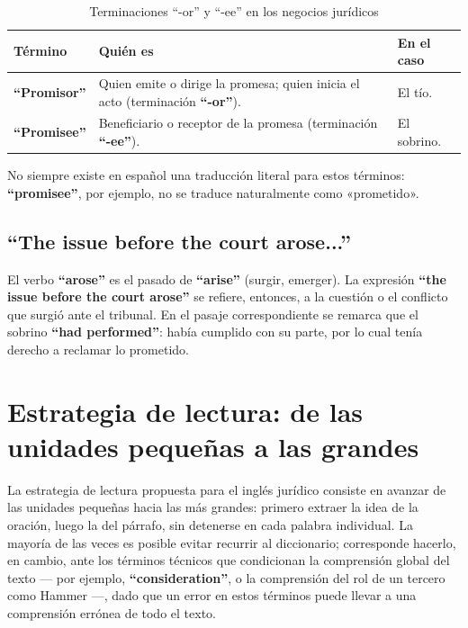\documentclass[12pt,oneside]{book}
\begin{document}
\begin{table}[H]
\centering
\caption{Terminaciones ``-or'' y ``-ee'' en los negocios jurídicos}
\begin{tabularx}{\textwidth}{
    >{\raggedright\arraybackslash}p{}
    >{\raggedright\arraybackslash}X
    >{\raggedright\arraybackslash}p{}
}
\toprule
\textbf{Término} & \textbf{Quién es} & \textbf{En el caso} \\
\midrule
\textbf{``Promisor''} & Quien emite o dirige la promesa; quien inicia el acto (terminación \textbf{``-or''}). & El tío. \\
\textbf{``Promisee''} & Beneficiario o receptor de la promesa (terminación \textbf{``-ee''}). & El sobrino. \\
\bottomrule
\end{tabularx}
\end{table}

No siempre existe en español una traducción literal para estos términos: \textbf{``promisee''}, por ejemplo, no se traduce naturalmente como «prometido».

\subsection{\texorpdfstring{``The issue before the court arose...''}{The issue before the court arose...}}

El verbo \textbf{``arose''} es el pasado de \textbf{``arise''} (surgir, emerger). La expresión \textbf{``the issue before the court arose''} se refiere, entonces, a la cuestión o el conflicto que surgió ante el tribunal. En el pasaje correspondiente se remarca que el sobrino \textbf{``had performed''}: había cumplido con su parte, por lo cual tenía derecho a reclamar lo prometido.

\section{Estrategia de lectura: de las unidades pequeñas a las grandes}

La estrategia de lectura propuesta para el inglés jurídico consiste en avanzar de las unidades pequeñas hacia las más grandes: primero extraer la idea de la oración, luego la del párrafo, sin detenerse en cada palabra individual. La mayoría de las veces es posible evitar recurrir al diccionario; corresponde hacerlo, en cambio, ante los términos técnicos que condicionan la comprensión global del texto --- por ejemplo, \textbf{``consideration''}, o la comprensión del rol de un tercero como Hammer ---, dado que un error en estos términos puede llevar a una comprensión errónea de todo el texto.
\end{document}
